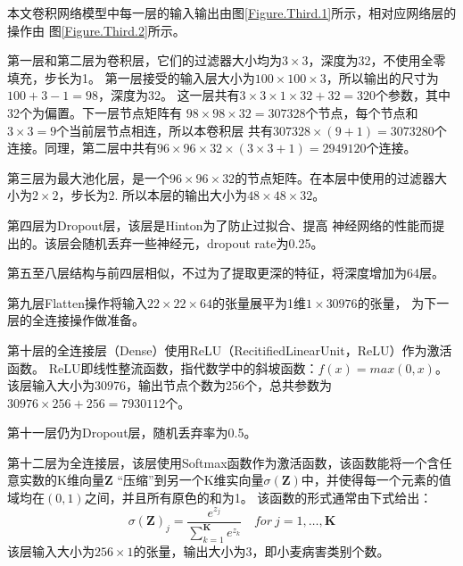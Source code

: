   本文卷积网络模型中每一层的输入输出由图\ref{Figure.Third.1}所示，相对应网络层的操作由
  图\ref{Figure.Third.2}所示。

  第一层和第二层为卷积层，它们的过滤器大小均为$3\times3$，深度为32，不使用全零填充，步长为1。
  第一层接受的输入层大小为$100\times100\times3$，所以输出的尺寸为$100+3-1=98$，深度为32。
  这一层共有$3\times3\times1\times32+32=320$个参数，其中32个为偏置。下一层节点矩阵有
  $98\times98\times32=307328$个节点，每个节点和$3\times3=9$个当前层节点相连，所以本卷积层
  共有$307328\times(9+1)=3073280$个连接。同理，第二层中共有$96\times96\times32\times(3\times3+1)=2949120$个连接。

  第三层为最大池化层，是一个$96\times96\times32$的节点矩阵。在本层中使用的过滤器大小为$2\times2$，步长为2.
  所以本层的输出大小为$48\times48\times32$。

  第四层为Dropout层，该层是Hinton为了防止过拟合、提高
  神经网络的性能而提出的。该层会随机丢弃一些神经元，dropout rate为0.25。

  第五至八层结构与前四层相似，不过为了提取更深的特征，将深度增加为64层。

  第九层Flatten操作将输入$22\times22\times64$的张量展平为1维$1\times30976$的张量，
  为下一层的全连接操作做准备。

  第十层的全连接层（Dense）使用ReLU（RecitifiedLinearUnit，ReLU）作为激活函数。
  ReLU即线性整流函数，指代数学中的斜坡函数：$f(x)=max(0,x)$。
  该层输入大小为$30976$，输出节点个数为256个，总共参数为$30976\times256+256=7930112$个。

  第十一层仍为Dropout层，随机丢弃率为0.5。

  第十二层为全连接层，该层使用Softmax函数作为激活函数，该函数能将一个含任意实数的K维向量$\mathbf{Z}$
  “压缩”到另一个K维实向量$\sigma(\mathbf{Z})$中，并使得每一个元素的值域均在$(0,1)$之间，并且所有原色的和为1。
  该函数的形式通常由下式给出：
  \[
    \sigma(\mathbf{Z})_j=\frac{e^{z_j}}{\sum^\mathbf{K}_{k=1} e^{z_k}} \quad for\ j=1, \dots,\mathbf{K}
  \]
  该层输入大小为$256\times1$的张量，输出大小为3，即小麦病害类别个数。




